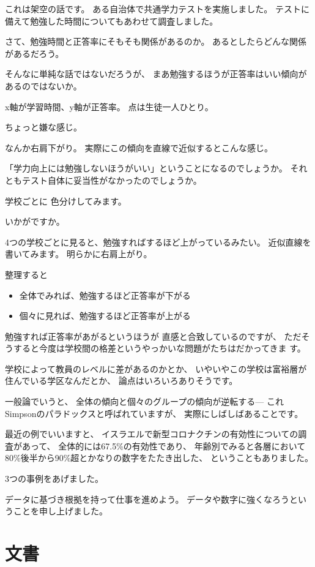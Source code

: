 \documentclass[uplatex,jis2004,dvipdfmx,12pt]{jsarticle}
\begin{document}
これは架空の話です。
ある自治体で共通学力テストを実施しました。
テストに備えて勉強した時間についてもあわせて調査しました。


さて、勉強時間と正答率にそもそも関係があるのか。
あるとしたらどんな関係があるだろう。

そんなに単純な話ではないだろうが、
まあ勉強するほうが正答率はいい傾向があるのではないか。


x軸が学習時間、y軸が正答率。
点は生徒一人ひとり。

ちょっと嫌な感じ。

なんか右肩下がり。
実際にこの傾向を直線で近似するとこんな感じ。

「学力向上には勉強しないほうがいい」ということになるのでしょうか。
それともテスト自体に妥当性がなかったのでしょうか。

学校ごとに
色分けしてみます。

いかがですか。

4つの学校ごとに見ると、勉強すればするほど上がっているみたい。
近似直線を書いてみます。
明らかに右肩上がり。

整理すると
\begin{itemize}[itemsep=5pt]
 \item 全体でみれば、勉強するほど正答率が下がる
 \item 個々に見れば、勉強するほど正答率が上がる
\end{itemize}

勉強すれば正答率があがるというほうが
直感と合致しているのですが、
ただそうすると今度は学校間の格差というやっかいな問題がたちはだかってきま
す。

学校によって教員のレベルに差があるのかとか、
いやいやこの学校は富裕層が住んでいる学区なんだとか、
論点はいろいろありそうです。


一般論でいうと、
全体の傾向と個々のグループの傾向が逆転する---
これSimpsonのパラドックスと呼ばれていますが、
実際にしばしばあることです。

最近の例でいいますと、
イスラエルで新型コロナクチンの有効性についての調査があって、
全体的には67.5\%の有効性であり、
年齢別でみると各層において80\%後半から90\%超とかなりの数字をたたき出した、
ということもありました。


3つの事例をあげました。

データに基づき根拠を持って仕事を進めよう。
データや数字に強くなろうということを申し上げました。


\section{文書}
\end{document}
